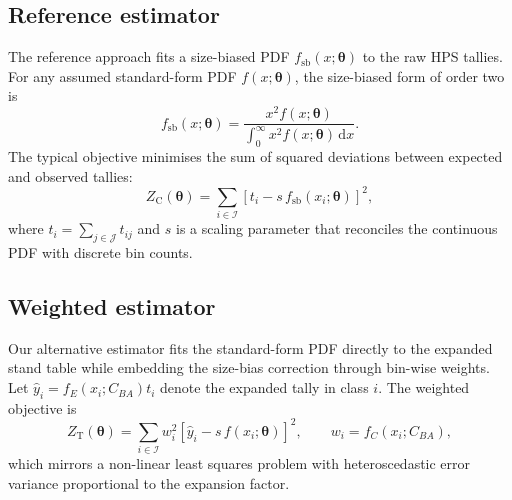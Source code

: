 \documentclass[12pt]{article}
\begin{document}
\subsection{Reference estimator}
The reference approach \citep{van1986, ducey2015} fits a size-biased PDF
$f_{\text{sb}}(x; \boldsymbol{\theta})$ to the raw HPS tallies. For any assumed
standard-form PDF $f(x; \boldsymbol{\theta})$, the size-biased form of order
two is
\begin{equation}
  f_{\text{sb}}(x; \boldsymbol{\theta}) =
  \frac{x^2 f(x; \boldsymbol{\theta})}{\int_0^\infty x^2 f(x; \boldsymbol{\theta}) \, \mathrm{d}x}.
  \label{eq:size-biased}
\end{equation}
The typical objective minimises the sum of squared deviations between expected
and observed tallies:
\begin{equation}
  Z_{\text{C}}(\boldsymbol{\theta}) =
  \sum_{i \in \mathcal{I}} \left[t_i - s \, f_{\text{sb}}(x_i; \boldsymbol{\theta})\right]^2,
  \label{eq:control-obj}
\end{equation}
where $t_i = \sum_{j \in \mathcal{J}} t_{ij}$ and $s$ is a scaling parameter
that reconciles the continuous PDF with discrete bin counts.

\subsection{Weighted estimator}
Our alternative estimator fits the standard-form PDF directly to the expanded
stand table while embedding the size-bias correction through bin-wise weights.
Let $\hat{y}_i = f_E(x_i; C_{BA}) t_i$ denote the expanded tally in class $i$.
The weighted objective is
\begin{equation}
  Z_{\text{T}}(\boldsymbol{\theta}) =
  \sum_{i \in \mathcal{I}} w_i^2
  \left[\hat{y}_i - s \, f(x_i; \boldsymbol{\theta})\right]^2,
  \qquad
  w_i = f_C(x_i; C_{BA}),
  \label{eq:test-obj}
\end{equation}
which mirrors a non-linear least squares problem with heteroscedastic error
variance proportional to the expansion factor.
\end{document}
